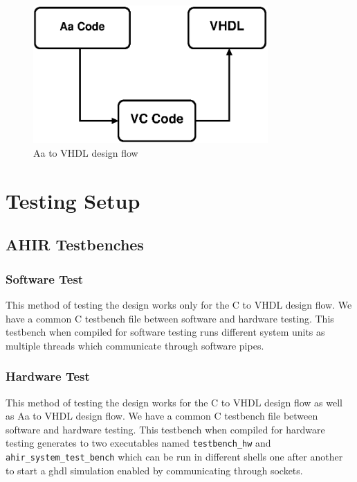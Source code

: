\begin{figure}[H]
\centering
\includegraphics[width=0.8\textwidth]{eps_pdf_sources/convolution_engine/implementation/aa_2_vhdl}
\caption{Aa to VHDL design flow}
\label{aa2vhdl}
\end{figure}

\section{Testing Setup}

\subsection{AHIR Testbenches}

\subsubsection{Software Test}
This method of testing the design works only for the C to VHDL design flow. We have a common C testbench file between software and hardware
testing. This testbench when compiled for software testing runs different system units as multiple threads which communicate through
software pipes.

\subsubsection{Hardware Test}
This method of testing the design works for the C to VHDL design flow as well as Aa to VHDL design flow. We have a common C testbench file
between software and hardware testing. This testbench when compiled for hardware testing generates to two executables named
\verb|testbench_hw| and \verb|ahir_system_test_bench| which can be run in different shells one after another to start a ghdl simulation
enabled by communicating through sockets.
